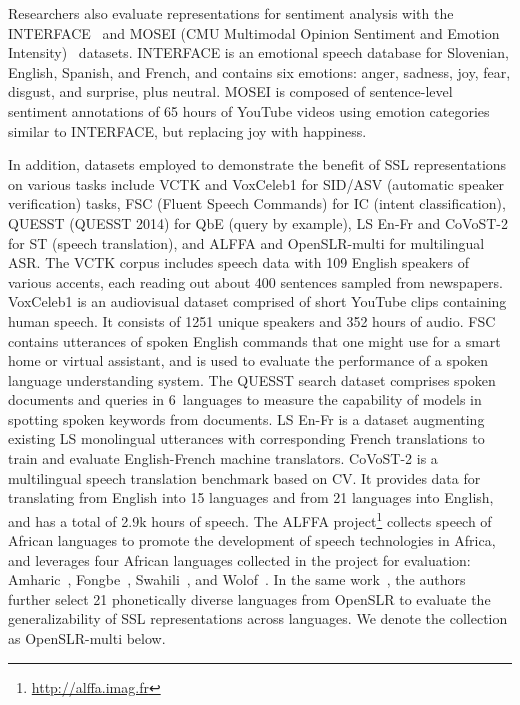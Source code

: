 Researchers also evaluate representations for sentiment analysis with the
INTERFACE~\parencite{hozjan_interface_2002} and MOSEI (CMU Multimodal Opinion
Sentiment and Emotion Intensity)~\parencite{zadeh_multimodal_2018} datasets. INTERFACE
is an emotional speech database for Slovenian, English, Spanish, and French,
and contains six emotions: anger, sadness, joy, fear, disgust, and
surprise, plus neutral. MOSEI is composed of sentence-level sentiment
annotations of 65 hours of YouTube videos
using emotion categories similar to INTERFACE, but replacing joy with
happiness.

In addition, datasets employed to demonstrate the benefit of SSL
representations on various tasks include VCTK \parencite{veaux_cstr_2016} and VoxCeleb1 \parencite{nagrani_voxceleb_2017} for SID/ASV (automatic speaker verification) tasks, FSC (Fluent Speech Commands) \parencite{lugosch_speech_2019} for IC (intent classification), QUESST
(QUESST 2014) \parencite{anguera_quesst2014_2015} for QbE (query by example), LS En-Fr \parencite{kocabiyikoglu_augmenting_2018} and CoVoST-2 \parencite{wang_covost_2020} for ST (speech translation), and ALFFA and OpenSLR-multi for multilingual ASR. The VCTK corpus includes speech
data with 109 English speakers of various accents, each reading out about 400
sentences sampled from newspapers. VoxCeleb1 is an audiovisual dataset
comprised of short YouTube clips containing human speech. It consists of 1251
unique speakers and 352 hours of audio. FSC contains utterances of spoken
English commands that one might use for a smart home or virtual assistant, and
is used to evaluate the performance of a spoken language understanding system.
The QUESST search dataset comprises spoken documents and queries in 6~languages
to measure the capability of models in spotting spoken keywords from documents.
LS En-Fr is a dataset augmenting existing LS monolingual utterances with
corresponding French translations to train and evaluate English-French machine
translators. CoVoST-2 is a multilingual speech translation benchmark based on
CV. It provides data for translating from English into 15 languages and from 21
languages into English, and has a total of 2.9k hours of speech. The ALFFA
project\footnote{\url{http://alffa.imag.fr}} collects speech of African
languages to promote the development of speech technologies in Africa, and
\parencite{kawakami_learning_2020} leverages four African languages collected in the
project for evaluation: Amharic~\parencite{tachbelie_using_2014}, Fongbe~\parencite{laleye_first_2016},
Swahili~\parencite{gelas_developments_2012}, and Wolof~\parencite{gauthier_collecting_2016}.
In the same work~\parencite{kawakami_learning_2020}, the authors
further select 21 phonetically diverse languages from OpenSLR to evaluate the
generalizability of SSL representations across languages. We denote the
collection as OpenSLR-multi below.

